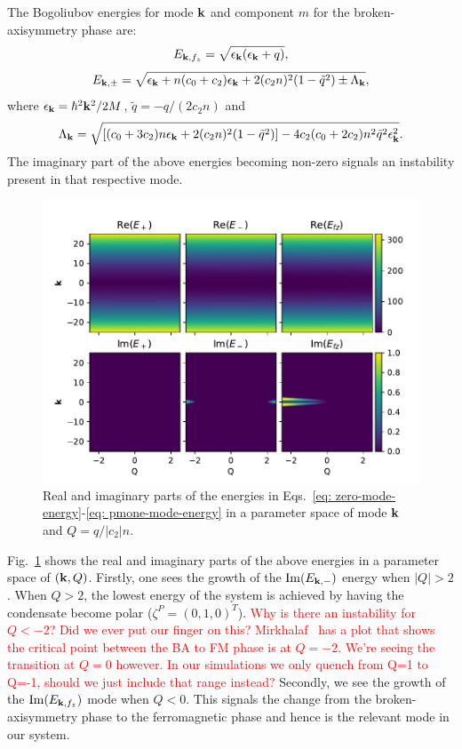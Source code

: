 The Bogoliubov energies for mode $\vb{k}$ and component $m$ for the
broken-axisymmetry phase are:
\begin{equation}
    E_{\vb{k}, {f_z}} = \sqrt{\epsilon_{\vb{k}}(\epsilon_{\vb{k}} + q)},
    \label{eq: zero-mode-energy}
\end{equation}
\begin{equation}
    E_{\vb{k}, \pm} = \sqrt{\epsilon_{\vb{k}} + n(c_0 + c_2)\epsilon_{\vb{k}} 
    + 2(c_2n)^2(1 - \tilde{q}^2) \pm \Lambda_{\vb{k}}},
    \label{eq: pmone-mode-energy}
\end{equation}
where $\epsilon_{\vb{k}} = \hbar^2\vb{k}^2 / 2M$, $\tilde{q} = -q/(2c_2n)$ and
\begin{equation}
    \Lambda_{\vb{k}} = \sqrt{[(c_0+3c_2)n\epsilon_{\vb{k}} 
    + 2(c_2n)^2(1-\tilde{q}^2)] 
    - 4c_2(c_0+2c_2)n^2\tilde{q}^2\epsilon_{\vb{k}}^2}.
\end{equation}
The imaginary part of the above energies becoming non-zero signals an
instability present in that respective mode.
\begin{figure}[tb]
    \centering
    \includegraphics[width=\textwidth]{gfx/ch-spin1/dens_spin_energies.pdf}
    \caption{Real and imaginary parts of the energies in
    Eqs.~\eqref{eq: zero-mode-energy}-\eqref{eq: pmone-mode-energy} in a
    parameter space of mode $\vb{k}$ and $Q=q/|c_2|n$.}
    \label{fig: dens-spin-energies}
\end{figure}
Fig.~\ref{fig: dens-spin-energies} shows the real and imaginary parts of the
above energies in a parameter space of $(\vb{k}, Q)$.
Firstly, one sees the growth of the $\mathrm{Im}(E_{\vb{k}, -})$ energy
when $|Q| > 2$.
When $Q>2$, the lowest energy of the system is achieved by having the condensate
become polar ($\zeta^P=(0,1,0)^T$).
\textcolor{red}{Why is there an instability for $Q<-2$? Did we ever put our
finger on this? Mirkhalaf~\cite{Mirkhalaf2021} has a plot that shows the
critical point between the BA to FM phase is at $Q = -2$. We're 
seeing the transition at $Q=0$ however. In our simulations we only quench
from Q=1 to Q=-1, should we just include that range instead?}
Secondly, we see the growth of the $\mathrm{Im}(E_{\vb{k}, {f_z}})$ mode when
$Q<0$.
This signals the change from the broken-axisymmetry phase to the ferromagnetic
phase and hence is the relevant mode in our system.


